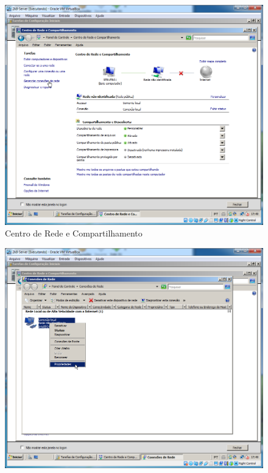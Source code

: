 \documentclass[10pt]{article}
\begin{document}
\begin{figure}[H]
    \centering
    \caption{Centro de Rede e Compartilhamento}
    \label{fig:4242}
    \includegraphics[width=\linewidth]{images/configuracao_windows/windows_server/030.png}
\end{figure}
\begin{figure}[H]
    \centering
    \caption{}
    \label{fig:4243}
    \includegraphics[width=\linewidth]{images/configuracao_windows/windows_server/031.png}
\end{figure}
\end{document}
